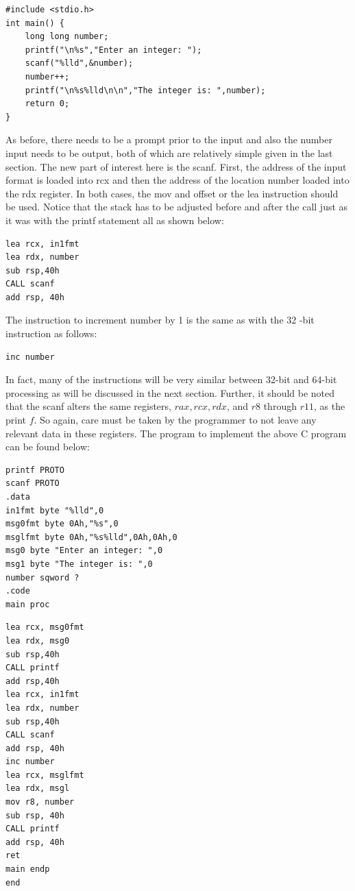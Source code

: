 \documentclass[10pt]{book}
\begin{document}
\begin{verbatim}
#include <stdio.h>
int main() {
    long long number;
    printf("\n%s","Enter an integer: ");
    scanf("%lld",&number);
    number++;
    printf("\n%s%lld\n\n","The integer is: ",number);
    return 0;
}
\end{verbatim}

As before, there needs to be a prompt prior to the input and also the number input needs to be output, both of which are relatively simple given in the last section. The new part of interest here is the scanf. First, the address of the input format is loaded into rcx and then the address of the location number loaded into the rdx register. In both cases, the mov and offset or the lea instruction should be used. Notice that the stack has to be adjusted before and after the call just as it was with the printf statement all as shown below:


\begin{verbatim}
lea rcx, in1fmt
lea rdx, number
sub rsp,40h
CALL scanf
add rsp, 40h
\end{verbatim}

The instruction to increment number by 1 is the same as with the 32 -bit instruction as follows:

\begin{verbatim}
inc number
\end{verbatim}

In fact, many of the instructions will be very similar between 32-bit and 64-bit processing as will be discussed in the next section. Further, it should be noted that the scanf alters the same registers, $r a x, r c x, r d x$, and $r 8$ through $r 11$, as the print $f$. So again, care must be taken by the programmer to not leave any relevant data in these registers. The program to implement the above C program can be found below:

\begin{verbatim}
printf PROTO
scanf PROTO
.data
in1fmt byte "%lld",0
msg0fmt byte 0Ah,"%s",0
msglfmt byte 0Ah,"%s%lld",0Ah,0Ah,0
msg0 byte "Enter an integer: ",0
msg1 byte "The integer is: ",0
number sqword ?
.code
main proc
\end{verbatim}

\begin{verbatim}
lea rcx, msg0fmt
lea rdx, msg0
sub rsp,40h
CALL printf
add rsp,40h
lea rcx, in1fmt
lea rdx, number
sub rsp,40h
CALL scanf
add rsp, 40h
inc number
lea rcx, msglfmt
lea rdx, msgl
mov r8, number
sub rsp, 40h
CALL printf
add rsp, 40h
ret
main endp
end
\end{verbatim}
\end{document}
